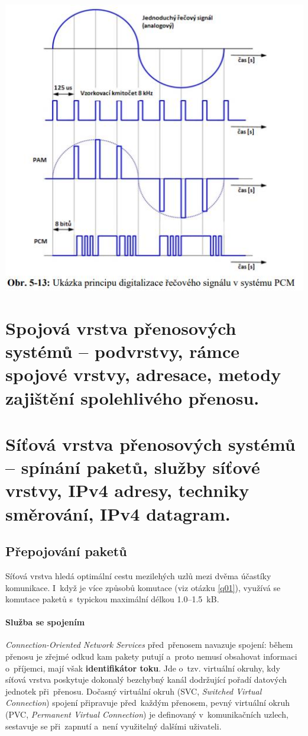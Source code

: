 \begin{center}
    \includegraphics[scale=0.75]{images/-022.jpg}
\end{center}

\clearpage
\section{Spojová vrstva přenosových systémů -- podvrstvy, rámce spojové vrstvy, adresace, metody zajištění spolehlivého přenosu.}

\clearpage
\section{Síťová vrstva přenosových systémů -- spínání paketů, služby síťové vrstvy, IPv4 adresy, techniky směrování, IPv4 datagram.}

\subsection{Přepojování paketů}

Síťová vrstva hledá optimální cestu mezilehých uzlů mezi dvěma účastíky komunikace. I~když je více způsobů komutace (viz otázku \ref{q01}), využívá se komutace paketů s~typickou maximální délkou 1.0--1.5~kB.

\paragraph{Služba se spojením} \emph{Connection-Oriented Network Services} před~přenosem navazuje spojení: během přenosu je zřejmé odkud kam pakety putují a~proto nemusí obsahovat informaci o~příjemci, mají však \textbf{identifikátor toku}. Jde o~tzv. virtuální okruhy, kdy síťová vrstva poskytuje dokonalý bezchybný kanál dodržující pořadí datových jednotek při~přenosu. Dočasný virtuální okruh (SVC, \emph{Switched Virtual Connection}) spojení připravuje před~každým přenosem, pevný virtuální okruh (PVC, \emph{Permanent Virtual Connection}) je definovaný v~komunikačních uzlech, sestavuje se při~zapnutí a~není využitelný dalšími uživateli.

